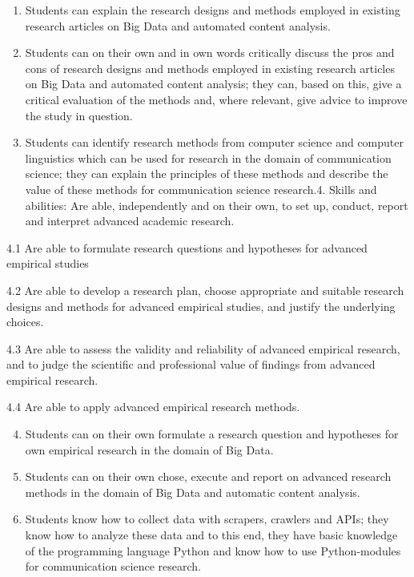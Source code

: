 \documentclass[a4paper,12pt]{report}
\begin{document}
\begin{enumerate}[A]
\item Students can explain the research designs and methods employed in existing research articles on Big Data and automated content analysis.
\item Students can on their own and in own words critically discuss the pros and cons of research designs and methods employed in existing research articles on Big Data and automated content analysis; they can, based on this, give a critical evaluation of the methods and, where relevant, give advice to improve the study in question.
\item Students can identify research methods from computer science and computer linguistics which can be used for research in the domain of communication science; they can explain the principles of these methods and describe the value of these methods for communication science research.4. Skills and abilities: Are able, independently and on their own, to set up, conduct, report and interpret advanced academic research.
\end{enumerate}

{\footnotesize{
4.1	Are able to formulate research questions and hypotheses for advanced empirical studies


4.2	Are able to develop a research plan, choose appropriate and suitable research designs and methods for advanced empirical studies, and justify the underlying choices. 


4.3	Are able to assess the validity and reliability of advanced empirical research, and to judge the scientific and professional value of findings from advanced empirical research.


4.4	Are able to apply advanced empirical research methods.

 }}

\begin{enumerate}[A]
\setcounter{enumi}{3}
\item Students can on their own formulate a research question and hypotheses for own empirical research in the domain of Big Data.
\item Students can on their own chose, execute and report on advanced research methods in the domain of Big Data and automatic content analysis.
\item Students know how to collect data with scrapers, crawlers and APIs; they know how to analyze these data and to this end, they have basic knowledge of the programming language Python and know how to use Python-modules for communication science research.
\end{enumerate}
\end{document}
